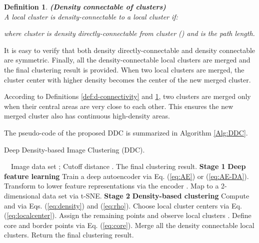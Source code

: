\documentclass[10pt,twocolumn,letterpaper]{article}
\newtheorem{theorem}{Theorem}
\newtheorem{definition}{Definition}
\begin{document}
\begin{definition}\label{def:connectivity}
\textbf{(Density connectable of clusters)} \\A local cluster  is density-connectable to a local cluster  if:

where cluster  is density directly-connectable from cluster  () and  is the path length.
\end{definition}
\noindent It is easy to verify that both density directly-connectable and density connectable are symmetric. Finally, all the density-connectable local clusters are merged and the final clustering result is provided. 
When two local clusters are merged, the cluster center with higher density becomes the center of the new merged cluster.

According to Definitions \ref{def:d-connectivity} and \ref{def:connectivity}, two clusters are merged only when their central areas are very close to each other. This ensures the new merged cluster also has continuous high-density areas. 

\iffalse
\begin{theorem}\label{the:center_density33}
If two clusters are density directly-connectable of clusters and thus be merged. The density of overlapped areas is not lower than . 
\textbf{This ensures that continuous high-density areas of the merged cluster. 
This prevents merging two clusters with overlapped areas which are with low density.
A local cluster center  owns the largest density value  locally in its neighborhood.}
\begin{proof}
The
\end{proof}
\end{theorem}
\fi

The pseudo-code of the proposed DDC is summarized in Algorithm \ref{Alg:DDC}.



\begin{algorithm}[!t]
\caption{Deep Density-based Image Clustering (DDC).}
\label{Alg:DDC}
\begin{algorithmic}[1]
\REQUIRE ~~Image data set ; Cutoff distance .
\ENSURE The final clustering result. 
\STATE \textbf{Stage 1}  \textbf{Deep feature learning}
\STATE Train a deep autoencoder via Eq. (\ref{eq:AE}) or (\ref{eq:AE-DA}).
\STATE Transform  to lower feature representations  via the encoder .
\STATE Map  to a 2-dimensional data set  via t-SNE.
\STATE \textbf{Stage 2}  \textbf{Density-based clustering}
\STATE Compute  and  via Eqs. (\ref{eq:density}) and (\ref{eq:rho}).
\ENDFOR
\STATE Choose local cluster centers via Eq. (\ref{eq:localcenter}).
\STATE Assign the remaining points and observe local clusters .
\STATE Define core and border points via Eq. (\ref{eq:core}).
\STATE Merge all the density connectable local clusters.
\STATE Return the final clustering result.
\end{algorithmic}
\end{algorithm}
\end{document}
